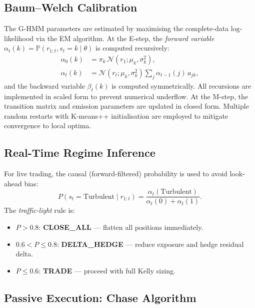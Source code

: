 \documentclass[conference]{IEEEtran}
\newcommand{\Prob}{\mathbb{P}}
\newcommand{\N}{\mathcal{N}}
\begin{document}
\subsection{Baum--Welch Calibration}

The G-HMM parameters are estimated by maximising the complete-data
log-likelihood via the EM algorithm.  At the E-step, the
\emph{forward variable} $\alpha_t(k) = \Prob(r_{1:t}, s_t=k\mid\theta)$
is computed recursively:
\begin{align}
  \alpha_0(k) &= \pi_k\,\N(r_1;\mu_k,\sigma_k^2), \nonumber\\
  \alpha_t(k) &= \N(r_t;\mu_k,\sigma_k^2)
                \sum_{j} \alpha_{t-1}(j)\,a_{jk}, \label{eq:forward}
\end{align}
and the backward variable $\beta_t(k)$ is computed symmetrically.
All recursions are implemented in scaled form to prevent numerical
underflow.  At the M-step, the transition matrix and emission
parameters are updated in closed form.  Multiple random restarts with
K-means++ initialisation are employed to mitigate convergence to
local optima.

\subsection{Real-Time Regime Inference}

For live trading, the causal (forward-filtered) probability is used to
avoid look-ahead bias:
\begin{equation}\label{eq:filtering}
  P(s_t = \text{Turbulent}\mid r_{1:t}) =
  \frac{\alpha_t(\text{Turbulent})}{\alpha_t(0) + \alpha_t(1)}.
\end{equation}
The \emph{traffic-light} rule is:
\begin{itemize}
  \item $P > 0.8$: \textbf{CLOSE\_ALL} — flatten all positions immediately.
  \item $0.6 < P \leq 0.8$: \textbf{DELTA\_HEDGE} — reduce exposure
        and hedge residual delta.
  \item $P \leq 0.6$: \textbf{TRADE} — proceed with full Kelly sizing.
\end{itemize}

\subsection{Passive Execution: Chase Algorithm}
\end{document}

